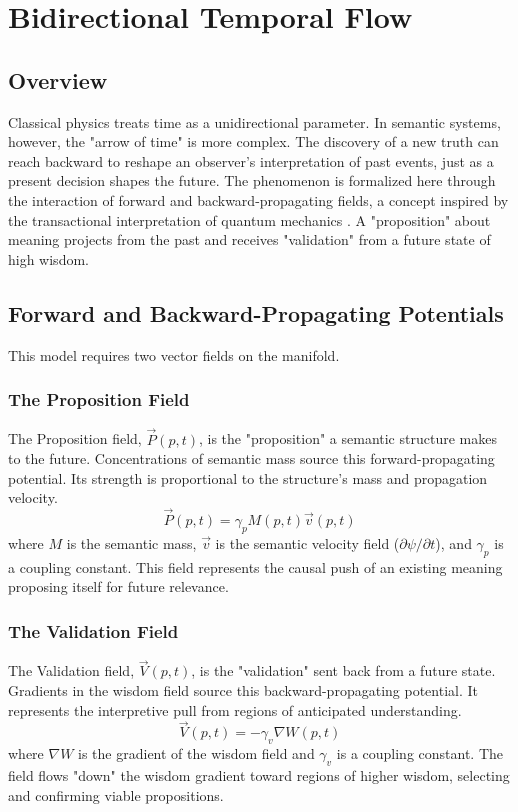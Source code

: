 \chapter{Bidirectional Temporal Flow}

\section{Overview}

Classical physics treats time as a unidirectional parameter. In semantic systems, however, the "arrow of time" is more complex. The discovery of a new truth can reach backward to reshape an observer's interpretation of past events, just as a present decision shapes the future. The phenomenon is formalized here through the interaction of forward and backward-propagating fields, a concept inspired by the transactional interpretation of quantum mechanics \autocite{Cramer1986}. A "proposition" about meaning projects from the past and receives "validation" from a future state of high wisdom.

\section{Forward and Backward-Propagating Potentials}

This model requires two vector fields on the manifold.

\subsection{The Proposition Field}
The Proposition field, \(\vec{P}(p,t)\), is the "proposition" a semantic structure makes to the future. Concentrations of semantic mass source this forward-propagating potential. Its strength is proportional to the structure's mass and propagation velocity.
\begin{equation}
\vec{P}(p,t) = \gamma_p M(p,t) \vec{v}(p,t)
\end{equation}
where \(M\) is the semantic mass, \(\vec{v}\) is the semantic velocity field (\(\partial\psi/\partial t\)), and \(\gamma_p\) is a coupling constant. This field represents the causal push of an existing meaning proposing itself for future relevance.

\subsection{The Validation Field}
The Validation field, \(\vec{V}(p,t)\), is the "validation" sent back from a future state. Gradients in the wisdom field source this backward-propagating potential. It represents the interpretive pull from regions of anticipated understanding.
\begin{equation}
\vec{V}(p,t) = -\gamma_v \nabla W(p,t)
\end{equation}
where \(\nabla W\) is the gradient of the wisdom field and \(\gamma_v\) is a coupling constant. The field flows "down" the wisdom gradient toward regions of higher wisdom, selecting and confirming viable propositions.

